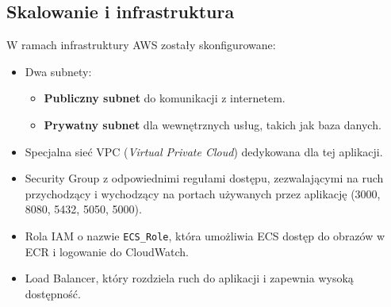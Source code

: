 \subsection{Skalowanie i infrastruktura}
W ramach infrastruktury AWS zostały skonfigurowane:
\begin{itemize}
    \item Dwa subnety:
    \begin{itemize}
        \item \textbf{Publiczny subnet} do komunikacji z internetem.
        \item \textbf{Prywatny subnet} dla wewnętrznych usług, takich jak baza danych.
    \end{itemize}
    \item Specjalna sieć VPC (\textit{Virtual Private Cloud}) dedykowana dla tej aplikacji.
    \item Security Group z odpowiednimi regułami dostępu, zezwalającymi na ruch przychodzący i wychodzący na portach używanych przez aplikację (3000, 8080, 5432, 5050, 5000).
    \item Rola IAM o nazwie \texttt{ECS\_Role}, która umożliwia ECS dostęp do obrazów w ECR i logowanie do CloudWatch.
    \item Load Balancer, który rozdziela ruch do aplikacji i zapewnia wysoką dostępność.
\end{itemize}
